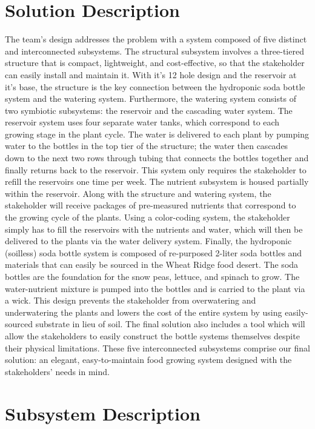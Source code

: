 \documentclass[12pt]{article}
\begin{document}
\section{Solution Description}
The team’s design addresses the problem with a system composed of five distinct and interconnected
subsystems. The structural subsystem involves a three-tiered structure that is compact, lightweight,
and cost-effective, so that the stakeholder can easily install and maintain it. With it’s 12 hole
design and the reservoir at it’s base, the structure is the key connection between the hydroponic
soda bottle system and the watering system. Furthermore,  the watering system consists of two
symbiotic subsystems: the reservoir and the cascading water system.  The reservoir system uses four
separate water tanks, which correspond to each growing stage in the plant cycle. The water is
delivered to each plant by pumping water to the bottles in the top tier of the structure; the water
then cascades down to the next two rows through tubing that connects the bottles together and
finally returns back to the reservoir. This system only requires the stakeholder to refill the
reservoirs one time per week. The nutrient subsystem is housed partially within the reservoir.
Along with the structure and watering system, the stakeholder will receive packages of pre-measured
nutrients that correspond to the growing cycle of the plants. Using a color-coding system, the
stakeholder simply has to fill the reservoirs with the nutrients and water, which will then be
delivered to the plants via the water delivery system. Finally, the hydroponic (soilless) soda
bottle system is composed of re-purposed 2-liter soda bottles and materials that can easily be
sourced in the Wheat Ridge food desert. The soda bottles are the foundation for the snow peas,
lettuce, and spinach to grow. The water-nutrient mixture is pumped into the bottles and is carried
to the plant via a wick. This design prevents the stakeholder from overwatering and underwatering
the plants and lowers the cost of the entire system by using easily-sourced substrate in lieu of
soil. The final solution also includes a tool which will allow the stakeholders to easily construct
the bottle systems themselves despite their physical limitations. These five interconnected
subsystems comprise our final solution: an elegant, easy-to-maintain food growing system designed
with the stakeholders’ needs in mind.

\section{Subsystem Description}
\end{document}
